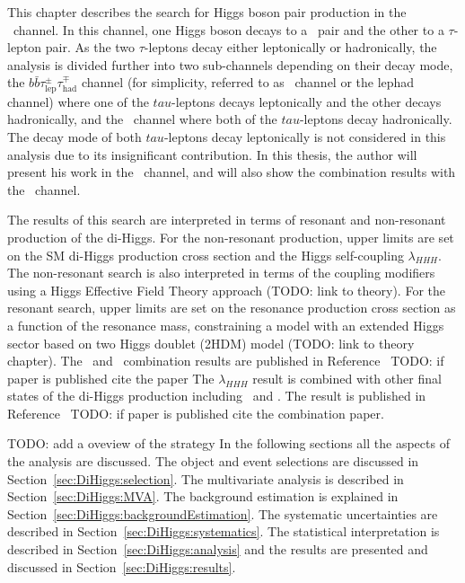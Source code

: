 This chapter describes the search for Higgs boson pair production in the
\bbtt\ channel. 
In this channel, one Higgs boson decays to a \bquark\ pair 
and the other to a $\tau$-lepton pair. 
As the two $\tau$-leptons decay either leptonically or hadronically, 
the analysis is divided further into two sub-channels depending on
their decay mode, 
the $b\bar{b}\tau_{\text{lep}}^{\pm}\tau_{\text{had}}^{\mp}$ channel 
(for simplicity, referred to as \bbttlh\ channel or the lephad channel)
where one of the $tau$-leptons decays leptonically and the other decays
hadronically, 
and the \bbtthh\ channel where both of the $tau$-leptons decay hadronically. 
The decay mode of both $tau$-leptons decay
leptonically is not considered in this analysis 
due to its insignificant contribution. 
In this thesis, the author will present his work 
in the \bbttlh\ channel, and will also show the combination results with 
the \bbtthh\ channel.


The results of this search are interpreted in terms of resonant and 
non-resonant production of the di-Higgs.
For the non-resonant production, upper limits are set on the SM di-Higgs production
cross section and the Higgs self-coupling $\lambda_{HHH}$.
The non-resonant search is also interpreted in terms of the coupling modifiers using a
Higgs Effective Field Theory approach (TODO: link to theory).
For the resonant search, upper limits are set on the resonance production cross section 
as a function of the resonance mass, 
constraining a model with an extended Higgs sector based on two Higgs doublet (2HDM) model
(TODO: link to theory chapter).
The \bbttlh\ and \bbtthh\
combination results are published in Reference~\cite{ATLAS-CONF-2021-030} 
TODO: if paper is published cite the paper
The $\lambda_{HHH}$ result is combined with other final states of the di-Higgs production
including \bbbb\ and \bbyy. 
The result is published in Reference~\cite{ATLAS-CONF-2021-052} TODO: if paper is published cite the combination paper. 

TODO: add a oveview of the strategy 
In the following sections all the aspects of the analysis are discussed. 
The object and event selections are discussed in Section~\ref{sec:DiHiggs:selection}.
The multivariate analysis is described in Section~\ref{sec:DiHiggs:MVA}. 
The background estimation is explained in Section~\ref{sec:DiHiggs:backgroundEstimation}. 
The systematic uncertainties are described in Section~\ref{sec:DiHiggs:systematics}. 
The statistical interpretation is described in Section~\ref{sec:DiHiggs:analysis}
and the results are presented and discussed in Section~\ref{sec:DiHiggs:results}.